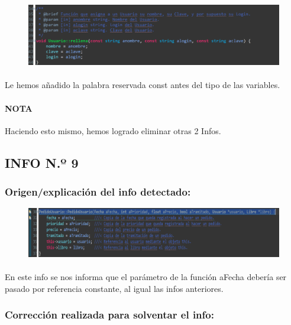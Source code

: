 			\begin{figure}[H]
				\centering
				\includegraphics[scale=0.55]{img/esteban13.png}
				\label{esteban13}
			\end{figure}
		
			\paragraph{}Le hemos añadido la palabra reservada const antes del tipo de las variables.
			
			\paragraph{NOTA}Haciendo esto mismo, hemos logrado eliminar otras 2 Infos.
	\subsection{INFO N.º 9}
	
		\subsubsection{Origen/explicación del info detectado:}
		
			\begin{figure}[H]
				\centering
				\includegraphics[scale=0.55]{img/esteban14.png}
				\label{esteban14}
			\end{figure}	
		
			\paragraph{}En este info se nos informa que el parámetro de la función aFecha debería ser pasado por referencia constante, al igual las infos anteriores.
			
		\subsubsection{Corrección realizada para solventar el info:}
		

